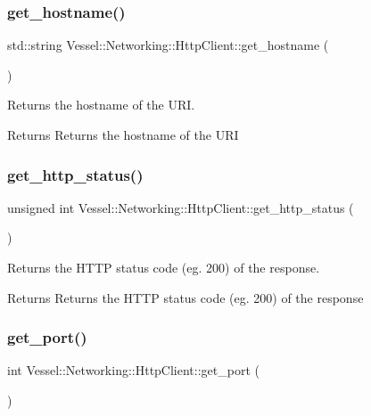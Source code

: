 \subsubsection{\texorpdfstring{get\+\_\+hostname()}{get\_hostname()}}
{\footnotesize\ttfamily std\+::string Vessel\+::\+Networking\+::\+Http\+Client\+::get\+\_\+hostname (\begin{DoxyParamCaption}{ }\end{DoxyParamCaption})}



Returns the hostname of the U\+RI. 

\begin{DoxyReturn}{Returns}
Returns the hostname of the U\+RI 
\end{DoxyReturn}
\mbox{\label{class_vessel_1_1_networking_1_1_http_client_a0bb9af88cb6fa0cda2d613165c9a7a24}} 
\subsubsection{\texorpdfstring{get\+\_\+http\+\_\+status()}{get\_http\_status()}}
{\footnotesize\ttfamily unsigned int Vessel\+::\+Networking\+::\+Http\+Client\+::get\+\_\+http\+\_\+status (\begin{DoxyParamCaption}{ }\end{DoxyParamCaption})}



Returns the H\+T\+TP status code (eg. 200) of the response. 

\begin{DoxyReturn}{Returns}
Returns the H\+T\+TP status code (eg. 200) of the response 
\end{DoxyReturn}
\mbox{\label{class_vessel_1_1_networking_1_1_http_client_a5ad06cb85c0c5359f46df21182e908e5}} 
\subsubsection{\texorpdfstring{get\+\_\+port()}{get\_port()}}
{\footnotesize\ttfamily int Vessel\+::\+Networking\+::\+Http\+Client\+::get\+\_\+port (\begin{DoxyParamCaption}{ }\end{DoxyParamCaption})}



